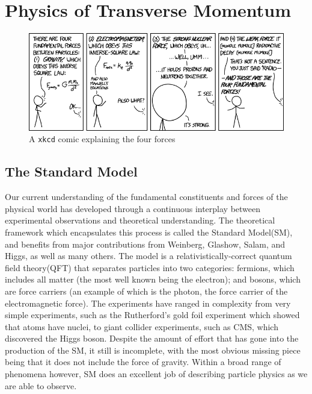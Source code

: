 \chapter{Physics of \texorpdfstring{\Z}{Z} Transverse Momentum}
\label{chapter:theory}
\begin{figure}[!htbp]
    \centering
    \includegraphics[width=\textwidth]{figures/TheoryFigures/fundamental_forcesXKCD.png}
    \caption[Short description of the four forces]{A \texttt{xkcd} comic explaining the four forces\cite{xkcdComic}}
    \label{fig:XKCDComic}
\end{figure}
\section{The Standard Model}
Our current understanding of the fundamental constituents and forces of the physical world has developed through a continuous interplay between experimental observations and theoretical understanding. The theoretical framework which encapsulates this process is called the Standard Model(SM), and benefits from major contributions from Weinberg, Glashow, Salam, and Higgs, as well as many others\cite{glashow1961,weinberg1967,salam1968,higgs1964}. The model is a relativistically-correct quantum field theory(QFT) that separates particles into two categories: fermions, which includes all matter (the most well known being the electron); and bosons, which are force carriers (an example of which is the photon, the force carrier of the electromagnetic force). The experiments have ranged in complexity from very simple experiments, such as the Rutherford's gold foil experiment\cite{rutherford1911} which showed that atoms have nuclei, to giant collider experiments, such as CMS, which discovered the Higgs boson. Despite the amount of effort that has gone into the production of the SM, it still is incomplete, with the most obvious missing piece being that it does not include the force of gravity. Within  a broad range of phenomena however, SM does an excellent job of describing particle physics as we are able to observe.


